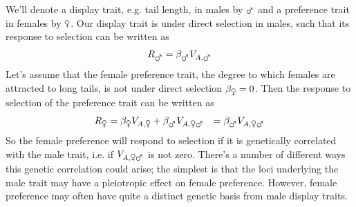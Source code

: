 We'll denote a display trait, e.g. tail length, in males by $\mars$ and a preference
trait in females by $\venus$. Our display trait is under direct selection in males, such that its response to selection can be written as
\begin{equation}
R_{\mars} = \beta_{\mars} V_{A, \mars}
\end{equation}
Let's assume that the female preference trait, the degree to which
females are attracted to long tails, is not under direct
selection $\beta_{\venus}=0$. Then the response to selection of the
preference trait can be written as
\begin{eqnarray}
R_{\venus} &=\beta_{\venus}V_{A,\venus}  + \beta_{\mars} V_{A, \venus
  \mars}
& = \beta_{\mars} V_{A, \venus  \mars}
\end{eqnarray}
So the female preference will respond to selection if it is
genetically correlated with the male trait, i.e. if $V_{A, \venus
  \mars}$ is not zero. There's a number of different ways this genetic correlation could arise; the
simplest is that the loci underlying the male trait may have a
pleiotropic effect on female preference. However, female preference
may often have quite a distinct genetic basis from male display traits.


